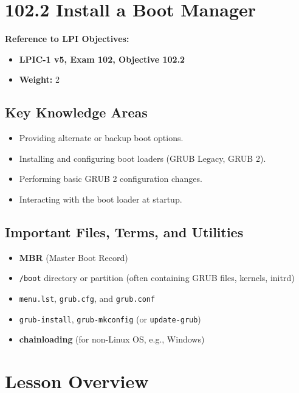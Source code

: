 \documentclass[a4paper]{report}
\begin{document}

\newpage

\section*{102.2 Install a Boot Manager}

\textbf{Reference to LPI Objectives:}
\begin{itemize}
    \item \textbf{LPIC-1 v5, Exam 102, Objective 102.2}
    \item \textbf{Weight:} 2
\end{itemize}

\subsection*{Key Knowledge Areas}
\begin{itemize}
    \item Providing alternate or backup boot options.
    \item Installing and configuring boot loaders (GRUB Legacy, GRUB 2).
    \item Performing basic GRUB 2 configuration changes.
    \item Interacting with the boot loader at startup.
\end{itemize}

\subsection*{Important Files, Terms, and Utilities}
\begin{itemize}
    \item \textbf{MBR} (Master Boot Record)
    \item \texttt{/boot} directory or partition (often containing GRUB files, kernels, initrd)
    \item \texttt{menu.lst}, \texttt{grub.cfg}, and \texttt{grub.conf}
    \item \texttt{grub-install}, \texttt{grub-mkconfig} (or \texttt{update-grub})
    \item \textbf{chainloading} (for non-Linux OS, e.g., Windows)
\end{itemize}

\section*{Lesson Overview}
\end{document}
